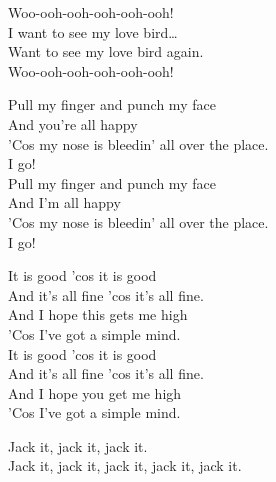 Woo-ooh-ooh-ooh-ooh-ooh! \\

I want to see my love bird… \\
Want to see my love bird again. \\

Woo-ooh-ooh-ooh-ooh-ooh! \\




Pull my finger and punch my face \\
And you're all happy \\
'Cos my nose is bleedin' all over the place. \\
I go! \\

Pull my finger and punch my face \\
And I'm all happy \\
'Cos my nose is bleedin' all over the place. \\
I go! \\




It is good 'cos it is good \\
And it's all fine 'cos it's all fine. \\
And I hope this gets me high \\
'Cos I've got a simple mind. \\

It is good 'cos it is good \\
And it's all fine 'cos it's all fine. \\
And I hope you get me high \\
'Cos I've got a simple mind. \\




Jack it, jack it, jack it. \\
Jack it, jack it, jack it, jack it, jack it. \\

